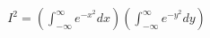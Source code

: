 \documentclass[preview]{standalone}
\begin{document}
\begin{align*}
I^2 = \left( \int_{-\infty}^{\infty} e^{-x^2} dx \right) \left( \int_{-\infty}^{\infty} e^{-y^2} dy \right)
\end{align*}
\end{document}
